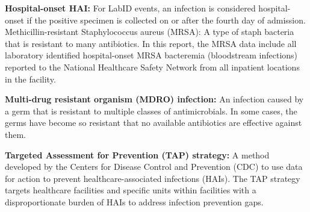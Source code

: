 {\bf Hospital-onset HAI:} For LabID events, an infection is considered hospital-onset if the positive specimen is collected on or after the fourth day of admission.
Methicillin-resistant Staphylococcus aureus (MRSA): A type of staph bacteria that is resistant to many antibiotics. In this report, the MRSA data include all laboratory identified hospital-onset MRSA bacteremia (bloodstream infections) reported to the National Healthcare Safety Network from all inpatient locations in
the facility.

{\bf Multi-drug resistant organism (MDRO) infection:} An infection caused by a germ that is resistant to multiple classes of antimicrobials. In some cases, the germs have become so resistant that no available antibiotics are effective against them.

{\bf Targeted Assessment for Prevention (TAP) strategy:} A method developed by the Centers for Disease Control and Prevention (CDC) to use data for action to prevent healthcare-associated infections (HAIs). The TAP strategy targets healthcare facilities and specific units within facilities with a disproportionate burden of
HAIs to address infection prevention gaps.





